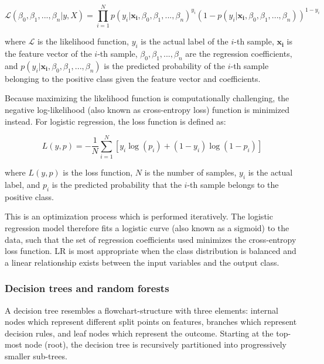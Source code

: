 \begin{equation}
	\mathcal{L}(\beta_0, \beta_1, ..., \beta_n | y, X) = \prod_{i=1}^{N} p(y_i | \bm{x_i}, \beta_0, \beta_1, ..., \beta_n)^{y_i} \left(1 - p(y_i | \bm{x_i}, \beta_0, \beta_1, ..., \beta_n)\right)^{1 - y_i}
\end{equation}

where $\mathcal{L}$ is the likelihood function, $y_i$ is the actual label of the $i$-th sample, $\bm{x_i}$ is the feature vector of the $i$-th sample, $\beta_0, \beta_1, ..., \beta_n$ are the regression coefficients, and $p(y_i | \bm{x_i}, \beta_0, \beta_1, ..., \beta_n)$ is the predicted probability of the $i$-th sample belonging to the positive class given the feature vector and coefficients.

Because maximizing the likelihood function is computationally challenging, the negative log-likelihood (also known as cross-entropy loss) function is minimized instead. For logistic regression, the loss function is defined as:

\begin{equation}
L(y, p) = -\frac{1}{N} \sum_{i=1}^{N} \left[ y_i \log(p_i) + (1 - y_i) \log(1 - p_i) \right]
\end{equation}

where $L(y, p)$ is the loss function, $N$ is the number of samples, $y_i$ is the actual label, and $p_i$ is the predicted probability that the $i$-th sample belongs to the positive class.

This is an optimization process which is performed iteratively. The logistic regression model therefore fits a logistic curve (also known as a sigmoid) to the data, such that the set of regression coefficients used minimizes the cross-entropy loss function. LR is most appropriate when the class distribution is balanced and a linear relationship exists between the input variables and the output class.

\subsubsection{Decision trees and random forests}

A decision tree resembles a flowchart-structure with three elements: internal nodes which represent different split points on features, branches which represent decision rules, and leaf nodes which represent the outcome. Starting at the top-most node (root), the decision tree is recursively partitioned into progressively smaller sub-trees. 

